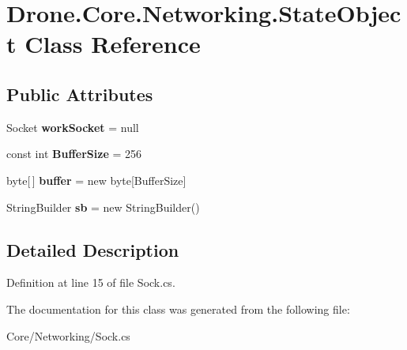 \hypertarget{class_drone_1_1_core_1_1_networking_1_1_state_object}{}\section{Drone.\+Core.\+Networking.\+State\+Object Class Reference}
\label{class_drone_1_1_core_1_1_networking_1_1_state_object}
\subsection*{Public Attributes}
\begin{DoxyCompactItemize}
\item 
\hypertarget{class_drone_1_1_core_1_1_networking_1_1_state_object_ac077255602cd7a0d42306960f8387dac}{}Socket {\bfseries work\+Socket} = null\label{class_drone_1_1_core_1_1_networking_1_1_state_object_ac077255602cd7a0d42306960f8387dac}

\item 
\hypertarget{class_drone_1_1_core_1_1_networking_1_1_state_object_a9c0b228b0698f79b3c9d6e0a6f7f325d}{}const int {\bfseries Buffer\+Size} = 256\label{class_drone_1_1_core_1_1_networking_1_1_state_object_a9c0b228b0698f79b3c9d6e0a6f7f325d}

\item 
\hypertarget{class_drone_1_1_core_1_1_networking_1_1_state_object_a5bc785c3c7c51dfee7113c62db7d9daf}{}byte\mbox{[}$\,$\mbox{]} {\bfseries buffer} = new byte\mbox{[}Buffer\+Size\mbox{]}\label{class_drone_1_1_core_1_1_networking_1_1_state_object_a5bc785c3c7c51dfee7113c62db7d9daf}

\item 
\hypertarget{class_drone_1_1_core_1_1_networking_1_1_state_object_a23651cb208f2bea90f279a3167c0c8a9}{}String\+Builder {\bfseries sb} = new String\+Builder()\label{class_drone_1_1_core_1_1_networking_1_1_state_object_a23651cb208f2bea90f279a3167c0c8a9}

\end{DoxyCompactItemize}


\subsection{Detailed Description}


Definition at line 15 of file Sock.\+cs.



The documentation for this class was generated from the following file\+:\begin{DoxyCompactItemize}
\item 
Core/\+Networking/Sock.\+cs\end{DoxyCompactItemize}

